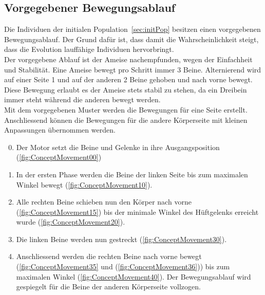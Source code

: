     \subsection{Vorgegebener Bewegungsablauf}

      Die Individuen der initialen Population~\vref{sec:initPop} besitzen einen vorgegebenen Bewegungsablauf.
      Der Grund dafür ist, dass damit die Wahrscheinlichkeit steigt,
      dass die Evolution lauffähige Individuen hervorbringt.
      \\
      Der vorgegebene Ablauf ist der Ameise nachempfunden, wegen der Einfachheit und Stabilität.
      Eine Ameise bewegt pro Schritt immer 3 Beine.
      Alternierend wird auf einer Seite 1 und auf der anderen 2 Beine gehoben und nach vorne bewegt.
      Diese Bewegung erlaubt es der Ameise stets stabil zu stehen,
      da ein Dreibein immer steht während die anderen bewegt werden.
      \\
      Mit dem vorgegebenen Muster werden die Bewegungen für eine Seite erstellt.
      Anschliessend können die Bewegungen für die andere Körperseite mit kleinen Anpassungen übernommen werden.

      \begin{enumerate}

        \setcounter{enumi}{-1}

        \item Der Motor setzt die Beine und Gelenke in ihre Ausgangsposition (\vref{fig:ConceptMovement00})

        \item In der ersten Phase werden die Beine der linken Seite bis zum maximalen Winkel bewegt
          (\vref{fig:ConceptMovement10}).

        \item Alle rechten Beine schieben nun den Körper nach vorne (\vref{fig:ConceptMovement15}) bis der minimale
          Winkel des Hüftgelenks erreicht wurde (\vref{fig:ConceptMovement20}).

        \item Die linken Beine werden nun gestreckt (\vref{fig:ConceptMovement30}).

        \item Anschliessend werden die rechten Beine nach vorne bewegt
          (\vref{fig:ConceptMovement35} und (\vref{fig:ConceptMovement36}))
          bis zum maximalen Winkel (\vref{fig:ConceptMovement40}).
          Der Bewegungsablauf wird gespiegelt für die Beine der anderen Körperseite vollzogen.

      \end{enumerate}

